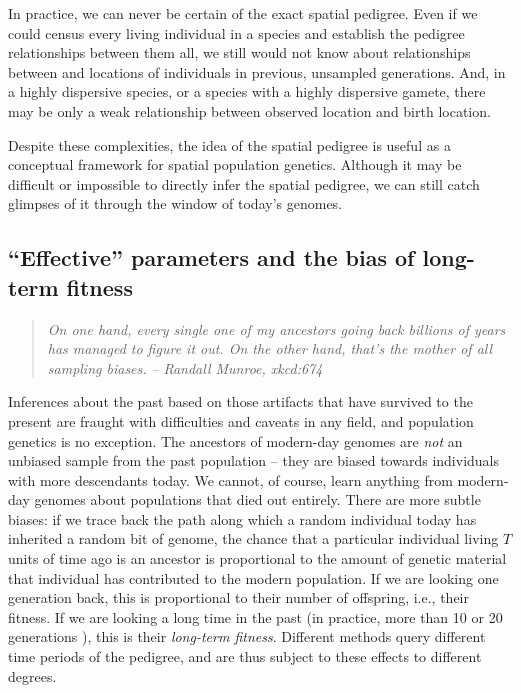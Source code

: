 \documentclass{ar-1col}
\begin{document}
In practice, we can never be certain of the exact spatial pedigree.
Even if we could census every living individual in a species
and establish the pedigree relationships between them all,
we still would not know about relationships between
and locations of individuals in previous, unsampled generations.
And, in a highly dispersive species,
or a species with a highly dispersive gamete,
there may be only a weak relationship between observed location and birth location.

Despite these complexities,
the idea of the spatial pedigree is useful
as a conceptual framework for spatial population genetics.
Although it may be difficult or impossible
to directly infer the spatial pedigree,
we can still catch glimpses of it through the window of today's genomes.


\subsection{``Effective'' parameters and the bias of long-term fitness}

\begin{quote}
    \textit{
    On one hand, every single one of my ancestors going back billions of years
    has managed to figure it out.
    On the other hand, that's the mother of all sampling biases.}
    \hfill \textit{-- Randall Munroe, xkcd:674}
\end{quote}

Inferences about the past
based on those artifacts that have survived to the present
are fraught with difficulties and caveats in any field, 
and population genetics is no exception.
The ancestors of modern-day genomes are \textit{not} an unbiased sample
from the past population -- 
they are biased towards individuals with more descendants today.
We cannot, of course, learn anything from modern-day genomes
about populations that died out entirely.
There are more subtle biases:
if we trace back the path along which a random individual today 
has inherited a random bit of genome,
the chance that a particular individual living $T$ units of time ago is an ancestor
is proportional to the amount of genetic material that individual has contributed to the modern population.
If we are looking one generation back, 
this is proportional to their number of offspring, i.e., their fitness.
If we are looking a long time in the past
(in practice, more than 10 or 20 generations \citep{BartonEtheridge2011fitness}),
this is their \textit{long-term fitness}.
Different methods query different time periods of the pedigree,
and are thus subject to these effects to different degrees.
\end{document}
